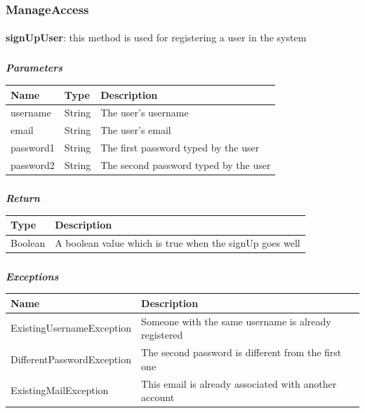 				\subsubsection{ManageAccess}
					\paragraph{}
							\textbf{signUpUser}: this method is used for registering a user in the system
							\subparagraph{}
							\vspace{-3mm}
							\textit{\textbf{Parameters}}
							\vspace{-2mm}
								\begin{table}[!h]
									\begin{tabular}{L{0.2\textwidth}L{0.2\textwidth}L{0.4\textwidth}}
										\toprule
										\textbf{Name} & \textbf{Type} & \textbf{Description} \\
										\midrule
								  		username & String & The user's username \\
								  		email & String & The user's email \\
								  		password1 & String & The first password typed by the user \\
								  		password2 & String & The second password typed by the user \\
								 		\bottomrule
									\end{tabular}
								\end{table}
							\subparagraph{}
							\vspace{-6mm}
								\textit{\textbf{Return}}
								\vspace{-2mm}
									\begin{table}[!h]
									\begin{tabular}{L{0.15\textwidth}L{0.65\textwidth}}
										\toprule
										\textbf{Type} & \textbf{Description} \\
										\midrule
								  		Boolean & A boolean value which is true when the signUp goes well \\
								 		\bottomrule
									\end{tabular}
								\end{table}
							\clearpage
							\subparagraph{}
								\textit{\textbf{Exceptions}}
								\vspace{-2mm}
									\begin{table}[!h]
									\begin{tabular}{L{0.4\textwidth}L{0.4\textwidth}}
										\toprule
										\textbf{Name} & \textbf{Description} \\
										\midrule
								  		ExistingUsernameException & Someone with the same username is already registered \\
								  		DifferentPasswordException & The second password is different from the first one \\
								  		ExistingMailException & This email is already associated with another account \\
								 		\bottomrule
									\end{tabular}
								\end{table}
							
